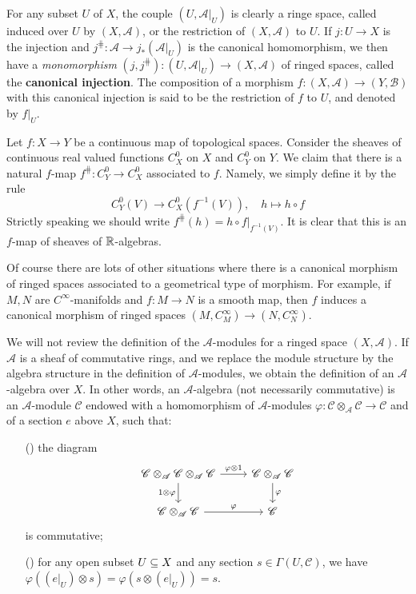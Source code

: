For any subset $U$ of $X$, the couple $(U,\mathscr{A}|_U)$ is clearly a ringe space, called induced over $U$ by $(X,\mathscr{A})$, or the restriction of $(X,\mathscr{A})$ to $U$. If $j:U\to X$ is the injection and $j^{\hash}:\mathscr{A}\to j_*(\mathscr{A}|_U)$ is the canonical homomorphism, we then have a \textit{monomorphism} $(j,j^{\hash}):(U,\mathscr{A}|_U)\to(X,\mathscr{A})$ of ringed spaces, called the \textbf{canonical injection}. The composition of a morphism $f:(X,\mathscr{A})\to(Y,\mathscr{B})$ with this canonical injection is said to be the restriction of $f$ to $U$, and denoted by $f|_U$.
\begin{example}
Let $f:X\to Y$ be a continuous map of topological spaces. Consider the sheaves of continuous real valued functions $C^0_X$ on $X$ and $C^0_Y$ on $Y$. We claim that there is a natural $f$-map $f^{\hash}:C^0_Y\to C^0_X$ associated to $f$. Namely, we simply define it by the rule
\[C^0_Y(V)\to C^0_X(f^{-1}(V)),\quad h\mapsto h\circ f\]
Strictly speaking we should write $f^{\hash}(h)=h\circ f|_{f^{-1}(V)}$. It is clear that this is an $f$-map of sheaves of $\mathbb{R}$-algebras.\par
Of course there are lots of other situations where there is a canonical morphism of ringed spaces associated to a geometrical type of morphism. For example, if $M,N$ are $C^\infty$-manifolds and $f:M\to N$ is a smooth map, then $f$ induces a canonical morphism of ringed spaces $(M,C^\infty_M)\to(N,C^\infty_N)$.
\end{example}
We will not review the definition of the $\mathscr{A}$-modules for a ringed space $(X,\mathscr{A})$. If $\mathscr{A}$ is a sheaf of commutative rings, and we replace the module structure by the algebra structure in the definition of $\mathscr{A}$-modules, we obtain the definition of an $\mathscr{A}$-algebra over $X$. In other words, an $\mathscr{A}$-algebra (not necessarily commutative) is an $\mathscr{A}$-module $\mathscr{C}$ endowed with a homomorphism of $\mathscr{A}$-modules $\varphi:\mathscr{C}\otimes_{\mathscr{A}}\mathscr{C}\to\mathscr{C}$ and of a section $e$ above $X$, such that:
\begin{itemize}
\item[(\rmnum{1})] the diagram 
\[\begin{tikzcd}
\mathscr{C}\otimes_{\mathscr{A}}\mathscr{C}\otimes_{\mathscr{A}}\mathscr{C}\ar[d,swap,"1\otimes\varphi"]\ar[r,"\varphi\otimes 1"]&\mathscr{C}\otimes_{\mathscr{A}}\mathscr{C}\ar[d,"\varphi"]\\
\mathscr{C}\otimes_{\mathscr{A}}\mathscr{C}\ar[r,"\varphi"]&\mathscr{C}
\end{tikzcd}\]
is commutative;
\item[(\rmnum{2})] for any open subset $U\subseteq X$ and any section $s\in\Gamma(U,\mathscr{C})$, we have $\varphi((e|_U)\otimes s)=\varphi(s\otimes(e|_U))=s$. 
\end{itemize} 
